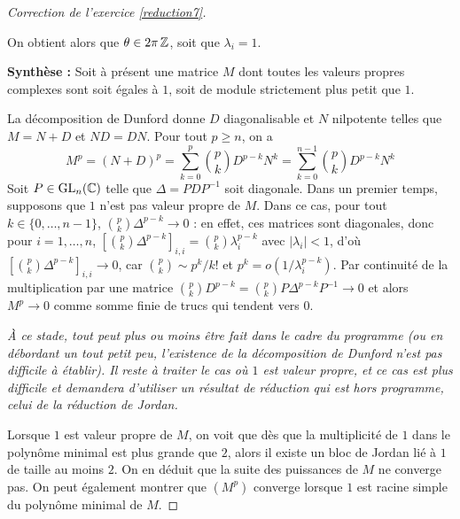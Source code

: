 \begin{proof}[Correction de l'exercice \ref{reduction7}]
\begin{itemize}
        On obtient alors que $\theta\in 2\pi\operatorname{\mathbb Z}$, soit que $\lambda_i=1$.
    \end{itemize}

    \textbf{Synthèse :} Soit à présent une matrice $M$ dont toutes les valeurs propres complexes sont soit égales à $1$,
    soit de module strictement plus petit que $1$.

    La décomposition de Dunford donne $D$ diagonalisable et $N$ nilpotente telles que $M=N+D$ et $ND=DN$.
    Pour tout $p\geq n$, on a 
    \[
        M^p=(N+D)^p=\sum_{k=0}^p\binom pkD^{p-k}N^k=\sum_{k=0}^{n-1}\binom pk D^{p-k}N^k   \tag*{(*)} 
    \]
    Soit $P\in\operatorname{GL}_n(\operatorname{\mathbb C})$ telle que $\Delta=PDP^{-1}$ soit diagonale. 
    Dans un premier temps, supposons que $1$ n'est pas valeur propre de $M$.
    Dans ce cas, pour tout $k\in\lbrace0,\dots,n-1\rbrace$, $\binom pk\Delta^{p-k}\to 0$ : en effet,
    ces matrices sont diagonales, donc pour $i=1,\dots,n$, $\left[\binom pk\Delta^{p-k}\right]_{i,i}=\binom pk\lambda_i^{p-k}$ avec 
    $|\lambda_i|<1$, d'où $\left[\binom pk\Delta^{p-k}\right]_{i,i}\to 0$, car $\binom pk\sim p^k/k!$ et $p^k=o(1/\lambda_i^{p-k})$.
    Par continuité de la multiplication par une matrice $\binom pk D^{p-k}=\binom pkP\Delta^{p-k}P^{-1}\to 0$ et alors $M^p\to 0$ comme somme finie de trucs qui tendent vers $0$.


    \textit{À ce stade, tout peut plus ou moins être fait dans le cadre du programme (ou en débordant un tout petit peu, l'existence de la 
    décomposition de Dunford n'est pas difficile à établir). Il reste à traiter le cas où $1$ est valeur propre, et ce cas est plus difficile 
    et demandera d'utiliser un résultat de réduction qui est hors programme, celui de la réduction de Jordan.}

    Lorsque $1$ est valeur propre de $M$, on voit que dès que la multiplicité
    de $1$ dans le polynôme minimal est plus grande que $2$, alors 
    il existe un bloc de Jordan lié à $1$ de taille au moins $2$.
    On en déduit que la suite des puissances de $M$ ne converge pas. 
    On peut également montrer que $(M^p)$ converge lorsque $1$ est racine simple du 
    polynôme minimal de $M$.
    
	
	
\end{proof}


